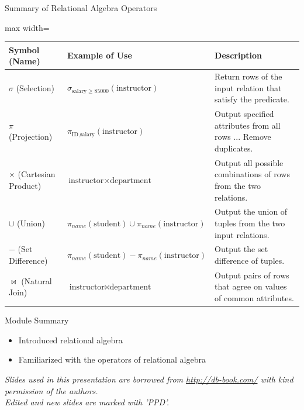 \documentclass[aspectratio=169, xcolor=dvipsnames]{beamer}
\begin{document}
\begin{frame}{Summary of Relational Algebra Operators}
    \begin{center}
        \begin{adjustbox}{max width=\textwidth}
        \begin{tabular}{lll}
        \toprule
        \textbf{Symbol} (Name) & \textbf{Example of Use} & \textbf{Description} \\ \midrule
        $\sigma$ (Selection) & $\sigma_{\text{salary} \ge 85000}(\text{instructor})$ & Return rows of the input relation that satisfy the predicate. \\
        $\pi$ (Projection) & $\pi_{\text{ID}, \text{salary}}(\text{instructor})$ & Output specified attributes from all rows ... Remove duplicates. \\
        $\times$ (Cartesian Product) & $\text{instructor} \times \text{department}$ & Output all possible combinations of rows from the two relations. \\
        $\cup$ (Union) & $\pi_{name}(\text{student}) \cup \pi_{name}(\text{instructor})$ & Output the union of tuples from the two input relations. \\
        $-$ (Set Difference) & $\pi_{name}(\text{student}) - \pi_{name}(\text{instructor})$ & Output the set difference of tuples. \\
        $\bowtie$ (Natural Join) & $\text{instructor} \bowtie \text{department}$ & Output pairs of rows that agree on values of common attributes. \\
        \bottomrule
        \end{tabular}
        \end{adjustbox}
    \end{center}
\end{frame}

\begin{frame}{Module Summary}
    \begin{itemize}
        \item Introduced relational algebra
        \item Familiarized with the operators of relational algebra
    \end{itemize}
    \vspace{2em}
    \begin{center}
    \small \textit{Slides used in this presentation are borrowed from \url{http://db-book.com/} with kind permission of the authors.} \\
    \small \textit{Edited and new slides are marked with 'PPD'.}
    \end{center}
\end{frame}
\end{document}
